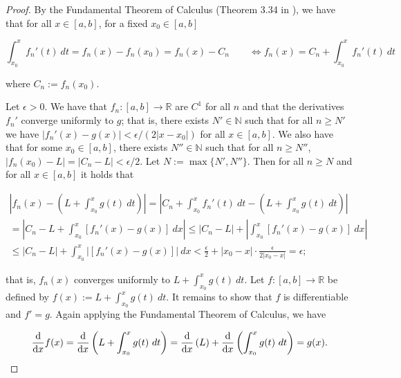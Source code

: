 \begin{proof}



By the Fundamental Theorem of Calculus (Theorem 3.34 in \citet{pugh2015real}), we have that for all \(x \in [a,b]\), for a fixed \(x_0 \in [a,b]\)

\[
\int_{x_0}^x f_n'(t) \ dt = f_n(x) - f_n(x_0) =  f_n(x) - C_n \qquad \iff f_n(x) = C_n + \int_{x_0}^x f_n'(t) \ dt  
\]

where \(C_n := f_n(x_0)\).

Let \(\epsilon >0\). We have that \(f_n: [a,b] \to \mathbb{R}\) are \(C^1\) for all \(n\) and that the derivatives \(f_n'\) converge uniformly to \(g\); that is, there exists \(N' \in \mathbb{N}\) such that for all \( n \geq N'\) we have \(|f_n'(x) - g(x)| < \epsilon/(2|x-x_0|)\) for all \(x \in [a,b]\). We also have that for some \(x_0 \in [a,b]\), there exists \(N'' \in \mathbb{N}\) such that for all \(n \geq N''\), \(|f_n(x_0) - L| = |C_n - L|  < \epsilon/2\). Let \(N := \max\{N', N''\}\). Then for all \(n \geq N\) and for all \(x \in [a,b]\) it holds that 

\begin{multline*}
 \left| f_n(x) - \left(L + \int_{x_0}^x g(t) \ dt  \right) \right|  =  \left| C_n + \int_{x_0}^x f_n'(t) \ dt - \left(L + \int_{x_0}^x g(t) \ dt  \right) \right| 
 \\ = \left| C_n  - L  + \int_{x_0}^x \left[  f_n'(x) - g(x)\right]  \ dx \right|
\leq \left| C_n  - L  \right| + \left|  \int_{x_0}^x \left[  f_n'(x) - g(x)\right]  \ dx \right| \\ \leq  \left| C_n  - L  \right| + \int_{x_0}^x  \left|  \left[  f_n'(x) - g(x)\right] \right|   \ dx  <  \frac{\epsilon}{2} + |x_0 - x| \cdot \frac{\epsilon}{2|x_0 - x|}
= \epsilon;
\end{multline*}

that is, \(f_n(x)\) converges uniformly to \(L + \int_{x_0}^x g(t) \ dt\). Let \(f: [a,b] \to \mathbb{R}\) be defined by \(f(x) := L + \int_{x_0}^x g(t) \ dt\). It remains to show that \(f\) is differentiable and \(f' = g\). Again applying the Fundamental Theorem of Calculus, we have

\[
\deriv{}{x} f(x) = \deriv{}{x}  \left( L + \int_{x_0}^x g(t) \ dt \right) = \deriv{}{x}  \left( L \right) +  \deriv{}{x}  \left(  \int_{x_0}^x g(t) \ dt \right) = g(x).
\]

\end{proof}

